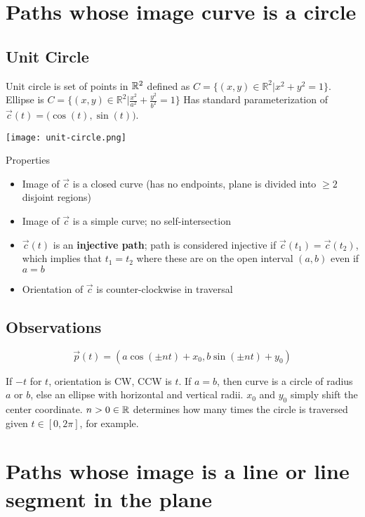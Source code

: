 \section{Paths whose image curve is a circle}

\subsection{Unit Circle}

Unit circle is set of points in $\mathbb{R}^2$ defined as $C=\{(x,y)\in\mathbb{R} ^2|x^2+y^2=1\}$. Ellipse is
$C=\{(x,y)\in\mathbb{R} ^2|\frac{x^2}{a^2}+\frac{y^2}{b^2}=1\}$
Has standard parameterization of $\vec{c}(t)=\big(\cos(t),\sin(t)\big)$.\newline 

\begin{center}
    \texttt{[image: unit-circle.png]}
\end{center}

\noindent Properties
\begin{itemize}
    \item Image of $\vec{c}$ is a closed curve (has no endpoints, plane is divided into $\geq 2$ disjoint regions)
    \item Image of $\vec{c}$ is a simple curve; no self-intersection 
    \item $\vec{c}(t)$ is an \textbf{injective path}; path is considered injective if $\vec{c}(t_1)=\vec{c}(t_2)$, which implies that $t_1=t_2$ where 
    these are on the open interval $(a,b)$ even if $a=b$
    \item Orientation of $\vec{c}$ is counter-clockwise in traversal
\end{itemize}

\subsection{Observations}

\[\boxed{\vec{p}(t)=(a\cos (\pm nt) + x_0, b\sin (\pm nt) + y_0)}\]

If $-t$ for $t$, orientation is CW, CCW is $t$. If $a=b$, then curve is 
a circle of radius $a$ or $b$, else an ellipse with horizontal and vertical radii.
$x_0$ and $y_0$ simply shift the center coordinate. $n>0\in \mathbb{R}$ determines how many times
the circle is traversed given $t\in[0,2\pi]$, for example.

\section{Paths whose image is a line or line segment in the plane}

